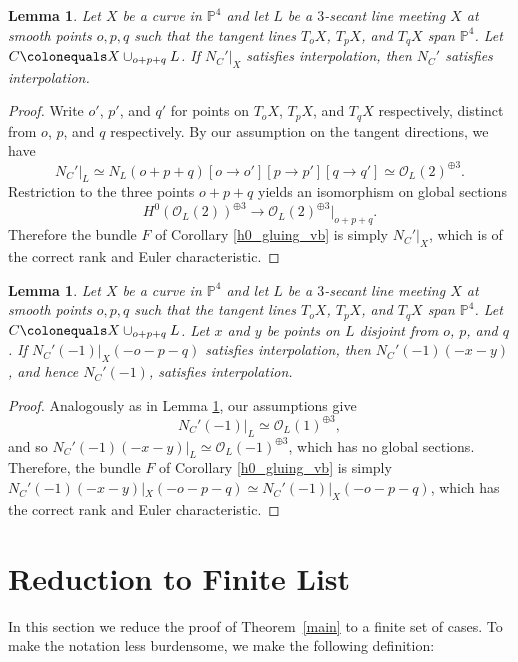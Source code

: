 \documentclass[11pt]{amsart}
\newcommand{\pp}{\mathbb{P}}
\renewcommand{\O}{\mathcal{O}}
\newtheorem{lem}[thm]{Lemma}
\newcommand{\defi}[1]{\textsf{#1}}
\theoremstyle{definition}
\newtheorem{defin}[thm]{Definition}
\theoremstyle{remark}
\begin{document}
\begin{lem}\label{3-secant}
Let $X$ be a curve in $\pp^4$ and let $L$ be a $3$-secant line meeting $X$ at smooth points $o, p, q$ such that the tangent lines $T_oX$, $T_pX$, and $T_qX$ span $\pp^4$.  Let $C \colonequals X \cup_{o +p+q} L$.  If $N_C'|_X$ satisfies interpolation, then $N_C'$ satisfies interpolation.
\end{lem}
\begin{proof}
Write $o'$, $p'$, and $q'$ for points on $T_oX$, $T_pX$, and $T_qX$
respectively, distinct from $o$, $p$, and $q$ respectively.
By our assumption on the tangent directions, we have  
\[N_C'|_L \simeq N_L(o+p+q)[o \to o'][p \to p'][q \to q'] \simeq \O_L(2)^{\oplus 3}.\]
Restriction to the three points $o+p+q$ yields an isomorphism on global sections
\[H^0(\O_L(2))^{\oplus 3} \to \O_L(2)^{\oplus 3}|_{o + p+ q}. \]
Therefore the bundle $F$ of Corollary \ref{h0_gluing_vb} is simply $N_C'|_X$, which is
of the correct rank and Euler characteristic.
\end{proof}


\begin{lem}\label{3-secant-twist}
Let $X$ be a curve in $\pp^4$ and let $L$ be a $3$-secant line meeting $X$
at smooth points $o, p, q$ such that the tangent lines $T_oX$, $T_pX$,
and $T_qX$ span $\pp^4$.  Let $C \colonequals X \cup_{o +p+q} L$.
Let $x$ and $y$ be points on $L$ disjoint from $o$, $p$, and $q$.
If $N_C'(-1)|_X(-o-p-q)$ satisfies interpolation, then $N_C'(-1)(-x-y)$,
and hence $N_C'(-1)$, satisfies interpolation.
\end{lem}
\begin{proof}
Analogously as in Lemma \ref{3-secant}, our assumptions give 
\[N_C'(-1)|_L \simeq \O_L(1)^{\oplus 3}, \]
and so $N_C'(-1)(-x-y)|_L \simeq \O_L(-1)^{\oplus 3}$, which has no global sections.  Therefore, the bundle $F$ of Corollary \ref{h0_gluing_vb} is simply
$N_C'(-1)(-x-y)|_X(-o-p-q) \simeq N_C'(-1)|_X(-o-p-q)$,
which has the correct rank and Euler characteristic.
\end{proof}


\section{Reduction to Finite List}\label{finitelist}

In this section we reduce the proof of Theorem~\ref{main}
to a finite set of cases.  To make the notation less burdensome, we make the following definition:

\end{document}
